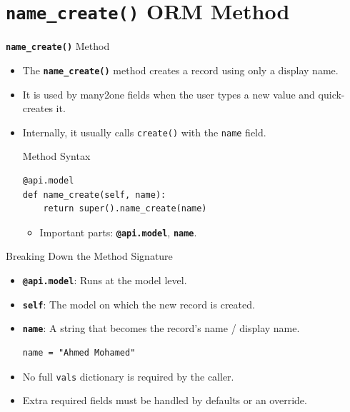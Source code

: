 
\section{\textbf{\texttt{name\_create()}} ORM Method}

\begin{frame}[fragile]{\textbf{\texttt{name\_create()}} Method}
	\begin{itemize}
		\item The \textbf{\texttt{name\_create()}} method creates a record using only a display name.
		\item It is used by many2one fields when the user types a new value and quick-creates it.
		\item Internally, it usually calls \texttt{create()} with the \texttt{name} field.
\begin{block}{Method Syntax}
\begin{lstlisting}
@api.model
def name_create(self, name):
	return super().name_create(name)
\end{lstlisting}
	\begin{itemize}
		\item Important parts: \textbf{\texttt{@api.model}}, \textbf{\texttt{name}}.
	\end{itemize}
\end{block}
	\end{itemize}
\end{frame}

\begin{frame}[fragile]{Breaking Down the Method Signature}
	\begin{block}{}
		\begin{itemize}
			\item \textbf{\texttt{@api.model}}: Runs at the model level.
			\item \textbf{\texttt{self}}: The model on which the new record is created.
			\item \textbf{\texttt{name}}: A string that becomes the record's name / display name.
\begin{lstlisting}
name = "Ahmed Mohamed"
\end{lstlisting}
			\item No full \texttt{vals} dictionary is required by the caller.
			\item Extra required fields must be handled by defaults or an override.
		\end{itemize}
	\end{block}
\end{frame}

